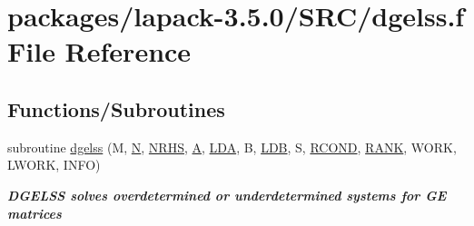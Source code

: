 \hypertarget{dgelss_8f}{}\section{packages/lapack-\/3.5.0/\+S\+R\+C/dgelss.f File Reference}
\label{dgelss_8f}
\subsection*{Functions/\+Subroutines}
\begin{DoxyCompactItemize}
\item 
subroutine \hyperlink{group__doubleGEsolve_gaa6ed601d0622edcecb90de08d7a218ec}{dgelss} (M, \hyperlink{polmisc_8c_a0240ac851181b84ac374872dc5434ee4}{N}, \hyperlink{example__user_8c_aa0138da002ce2a90360df2f521eb3198}{N\+R\+H\+S}, \hyperlink{classA}{A}, \hyperlink{example__user_8c_ae946da542ce0db94dced19b2ecefd1aa}{L\+D\+A}, B, \hyperlink{example__user_8c_a50e90a7104df172b5a89a06c47fcca04}{L\+D\+B}, S, \hyperlink{superlu__enum__consts_8h_af00a42ecad444bbda75cde1b64bd7e72a9b5c151728d8512307565994c89919d5}{R\+C\+O\+N\+D}, \hyperlink{splinemodule_8c_a3a88bcc63386de30443dacede2e01847}{R\+A\+N\+K}, W\+O\+R\+K, L\+W\+O\+R\+K, I\+N\+F\+O)
\begin{DoxyCompactList}\small\item\em {\bfseries  D\+G\+E\+L\+S\+S solves overdetermined or underdetermined systems for G\+E matrices} \end{DoxyCompactList}\end{DoxyCompactItemize}
